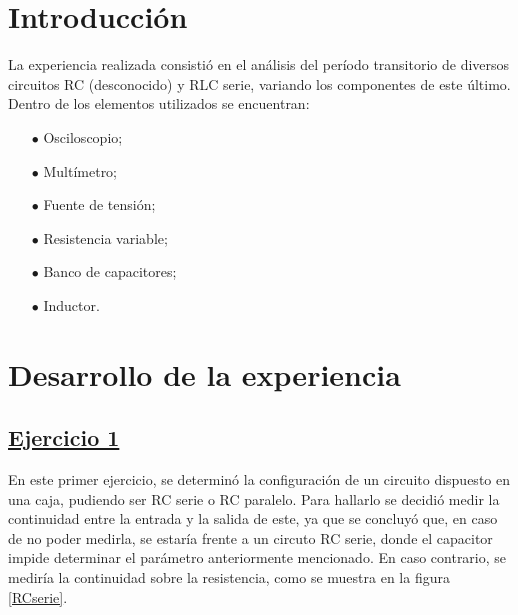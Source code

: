 \documentclass[a4paper]{article}
\begin{document}




\section*{Introducción}
La experiencia realizada consistió en el análisis del período transitorio de diversos circuitos RC (desconocido) y RLC serie, variando los componentes de este último. Dentro de los elementos utilizados se encuentran:
	\begin{itemize}
	\item[$\bullet$]	Osciloscopio;
	\item[$\bullet$]	Multímetro;
	\item[$\bullet$]	Fuente de tensión;
	\item[$\bullet$]	Resistencia variable;
	\item[$\bullet$]	Banco de capacitores;
	\item[$\bullet$]	Inductor.
	\end{itemize}	  

\section*{Desarrollo de la experiencia}

\subsection*{\underline{Ejercicio 1}}


En este primer ejercicio, se determinó la configuración de un circuito dispuesto en una caja, pudiendo ser RC serie o RC paralelo. Para hallarlo se decidió medir la continuidad entre la entrada y la salida de este, ya que se concluyó que, en caso de no poder medirla, se estaría frente a un circuto RC serie, donde el capacitor impide determinar el parámetro anteriormente mencionado. En caso contrario, se mediría la continuidad sobre la resistencia, como se muestra en la figura \ref{RCserie}.
\end{document}
